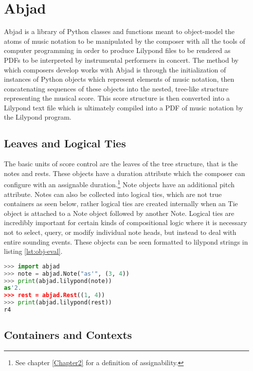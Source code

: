 \section{Abjad}

Abjad is a library of Python classes and functions meant to object-model the atoms of music notation to be manipulated by the composer with all the tools of computer programming in order to produce Lilypond files to be rendered as \acp{PDF} to be interpreted by instrumental performers in concert. The method by which composers develop works with Abjad is through the initialization of instances of Python objects which represent elements of music notation, then concatenating sequences of these objects into the nested, tree-like structure representing the musical score. This score structure is then converted into a Lilypond text file which is ultimately compiled into a \ac{PDF} of music notation by the Lilypond program.

\subsection{Leaves and Logical Ties}

The basic units of score control are the leaves of the tree structure, that is the notes and rests. These objects have a duration attribute which the composer can configure with an assignable duration.\footnote{See chapter \ref{Chapter2} for a definition of assignability.} Note objects have an additional pitch attribute. Notes can also be collected into logical ties, which are not true containers as seen below, rather logical ties are created internally when an Tie object is attached to a Note object followed by another Note. Logical ties are incredibly important for certain kinds of compositional logic where it is necessary not to select, query, or modify individual note heads, but instead to deal with entire sounding events. These objects can be seen formatted to lilypond strings in listing \ref{lst:obj-eval}.

\begin{lstlisting}[language=Python,frame=tb,caption={Object evaluation as Lilypond strings},label=lst:obj-eval]
>>> import abjad
>>> note = abjad.Note("as'", (3, 4))
>>> print(abjad.lilypond(note))
as'2.
>>> rest = abjad.Rest((1, 4))
>>> print(abjad.lilypond(rest))
r4
\end{lstlisting}

\subsection{Containers and Contexts}

